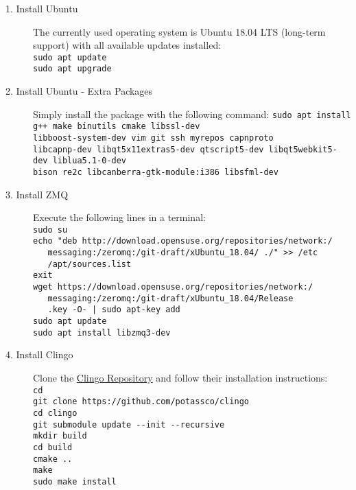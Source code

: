 \begin{description}
	\item[1. Install Ubuntu] The currently used operating system is Ubuntu 18.04 LTS (long-term support) with all available updates installed:\\
	\verb#sudo apt update#\\
  \verb#sudo apt upgrade#
	\item[2. Install Ubuntu - Extra Packages] Simply install the package with the following command: \verb#sudo apt install g++ make binutils cmake libssl-dev#\\
	\verb#libboost-system-dev vim git ssh myrepos capnproto#\\
	\verb#libcapnp-dev libqt5x11extras5-dev qtscript5-dev libqt5webkit5-dev liblua5.1-0-dev#\\
	\verb#bison re2c libcanberra-gtk-module:i386 libsfml-dev#	
	\item[3. Install ZMQ] Execute the following lines in a terminal:\\
\verb#sudo su#\\
\verb#echo "deb http://download.opensuse.org/repositories/network:/#\\\verb#   messaging:/zeromq:/git-draft/xUbuntu_18.04/ ./" >> /etc#\\\verb#   /apt/sources.list#\\
\verb#exit#\\
\verb#wget https://download.opensuse.org/repositories/network:/#\\\verb#   messaging:/zeromq:/git-draft/xUbuntu_18.04/Release#\\\verb#   .key -O- | sudo apt-key add#\\
\verb#sudo apt update#\\
\verb#sudo apt install libzmq3-dev#
	\item[4. Install Clingo] Clone the \href{https://github.com/potassco/clingo}{Clingo Repository} and follow their installation instructions:\\
\verb#cd#\\
\verb#git clone https://github.com/potassco/clingo#\\
\verb#cd clingo#\\
\verb#git submodule update --init --recursive#\\
\verb#mkdir build#\\
\verb#cd build#\\
\verb#cmake ..#\\
\verb#make#\\
\verb#sudo make install#\\

\end{description}
